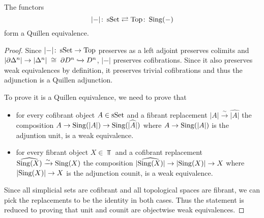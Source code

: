 \begin{prop}
    The functors
    \begin{equation*}
        \lvert-\rvert\colon\operatorname{sSet}\rightleftarrows\operatorname{Top}\colon\operatorname{Sing}(-)
    \end{equation*}
    form a Quillen equivalence. 
    \begin{proof}
        Since $\lvert-\rvert\colon\operatorname{sSet}\to\operatorname{Top}$ preserves as a left adjoint preserves colimits and $\lvert\partial\Delta^n\rvert\to\lvert\Delta^n\rvert\;\cong\;\partial D^n\xhookrightarrow{} D^n$, $\lvert-\rvert$ preserves cofibrations.
        Since it also preserves weak equivalences by definition, it preserves trivial cofibrations and thus the adjunction is a Quillen adjunction.

        To prove it is a Quillen equivalence, we need to prove that 
        \begin{itemize}
            \item for every cofibrant object $A\in\operatorname{sSet}$ and a fibrant replacement $\lvert A\rvert\xrightarrow{\sim}\widehat{\lvert A\rvert}$ the composition $A\to\operatorname{Sing}(\lvert A\rvert)\to\operatorname{Sing}(\widehat{\lvert A\rvert})$ where $A\to\operatorname{Sing}(\lvert A\rvert)$ is the adjuntion unit, is a weak equivalence.
            \item for every fibrant object $X\in\Top$ and a cofibrant replacement $\widehat{\operatorname{Sing}(X)}\xrightarrow{\sim}\operatorname{Sing}(X)$ the composition $\lvert\widehat{\operatorname{Sing}(X)}\rvert\to\lvert\operatorname{Sing}(X)\rvert\to X$ where $\lvert\operatorname{Sing}(X)\rvert\to X$ is the adjunction counit, is a weak equivalence.
        \end{itemize}
        Since all simplicial sets are cofibrant and all topological spaces are fibrant, we can pick the replacements to be the identity in both cases.
        Thus the statement is reduced to proving that unit and counit are objectwise weak equivalences. %
    \end{proof}
\end{prop}
